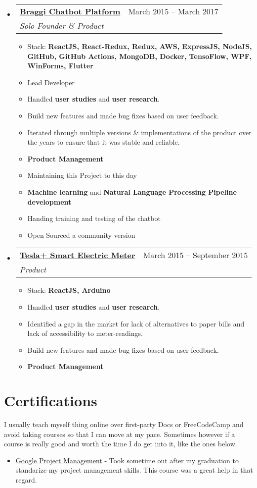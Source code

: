 \documentclass[a4paper,11pt]{article}
\makeatletter
\newcommand{\resumeItem}[1]{
  \item\large{#1}
}
\newcommand{\resumeItemListStart}{\begin{itemize}[rightmargin=0.11in]}
\newcommand{\resumeItemListEnd}{\end{itemize}}
\newcommand{\resumeQuadHeading}[4]{
  \item
  \begin{tabular*}{0.96\textwidth}[t]{l@{\extracolsep{\fill}}r}
    \textbf{#1} & #2 \\
    \textit{\large#3} & \textit{\large #4} \\
  \end{tabular*}
}
\newcommand{\resumeHeadingListStart}{
  \begin{itemize}[leftmargin=0.15in, label={}]
}
\newcommand{\resumeHeadingListEnd}{\end{itemize}}
\makeatother
\begin{document}
  \resumeHeadingListStart{}
  \resumeQuadHeading{{\uline{Braggi Chatbot Platform
}}}{March 2015 -- March 2017}
  {Solo Founder \& Product}{}
      \resumeItemListStart{}
		\large{Built a production quality chatbot service paired with cross-platform apps build on React and Flutter.}
		\resumeItem{Stack: \textbf{ReactJS,
			React-Redux,
			Redux,
			AWS,
			ExpressJS,
			NodeJS,
			GitHub,
			GitHub Actions,
			MongoDB,
			Docker,
			TensoFlow,
			WPF,
			WinForms,
			Flutter}}
		\resumeItem{Lead Developer}
		\resumeItem{Handled \textbf{user studies} and \textbf{user research}.}
		\resumeItem{Build new features and made bug fixes based on user feedback.}
		\resumeItem{Iterated through multiple versions \& implementations of the product over the years to ensure that it was stable and reliable.}
		\resumeItem{\textbf{Product Management}}
		\resumeItem{Maintaining this Project to this day}
		\resumeItem{\textbf{Machine learning} and \textbf{Natural Language Processing Pipeline development}}
		\resumeItem{Handing training and testing of the chatbot}
		\resumeItem{Open Sourced a community version}
      \resumeItemListEnd{}
  \resumeHeadingListEnd{}

  \resumeHeadingListStart{}
  \resumeQuadHeading{{\uline{Tesla+ Smart Electric Meter
}}}{March 2015 -- September 2015
}
  {Product}{}
      \resumeItemListStart{}
		\large{A smart electric meter add-on that connects to a standard electric meter and reports all usage metrics to a local hub which makes the data available via a mobile app and also to administration. Qualified for the CBSE National Science Fair's National level with this project!}
		\resumeItem{Stack: \textbf{ReactJS,
		Arduino}}
		\resumeItem{Handled \textbf{user studies} and \textbf{user research}.}
		\resumeItem{Identified a gap in the market for lack of alternatives to paper bills and lack of accessibility to meter-readings.}
		\resumeItem{Build new features and made bug fixes based on user feedback.}
		\resumeItem{\textbf{Product Management}}
      \resumeItemListEnd{}
  \resumeHeadingListEnd{}



\section{\LARGE{Certifications}}
  \large{I usually teach myself thing online over first-party Docs or FreeCodeCamp and avoid taking courses so that I can move at my pace. Sometimes however if a course is really good and worth the time I do get into it, like the ones below.
	}
  \resumeItemListStart{}
    \resumeItem{\href{https://www.coursera.org/account/accomplishments/specialization/certificate/HYKASZDT4AXM}{\uline{Google Project Management}} - Took sometime out after my graduation to standarize my project management skills. This course was a great help in that regard.}
  \resumeItemListEnd{}
\end{document}
